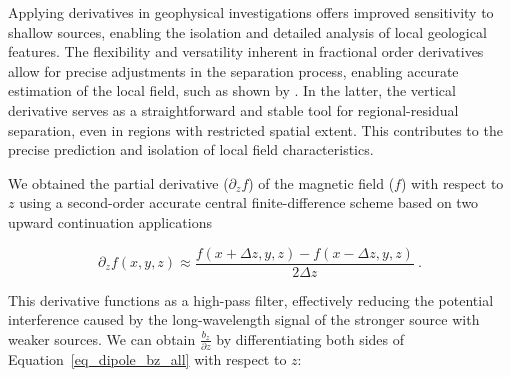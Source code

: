 Applying derivatives in geophysical investigations offers improved sensitivity to shallow sources, enabling the isolation and detailed analysis of local geological features. The flexibility and versatility inherent in fractional order derivatives allow for precise adjustments in the separation process, enabling accurate estimation of the local field, such as shown by \citet{Florio2022}. In the latter, the vertical derivative serves as a straightforward and stable tool for regional-residual separation, even in regions with restricted spatial extent. This contributes to the precise prediction and isolation of local field characteristics. 

We obtained the partial derivative ($\partial_z f$) of the magnetic field ($f$) with respect to $z$ using a second-order accurate central finite-difference scheme based on two upward continuation applications

\begin{equation}
\partial_z f(x, y, z) \approx
\dfrac{f(x + \Delta z, y, z) - f(x - \Delta z, y, z)}{2 \Delta z}
\ .
\end{equation}

This derivative functions as a high-pass filter, effectively reducing the potential interference caused by the long-wavelength signal of the stronger source with weaker sources. We can obtain \( \frac{b_z}{\partial z} \) by differentiating both sides of Equation~\ref{eq_dipole_bz_all} with respect to \( z \):



